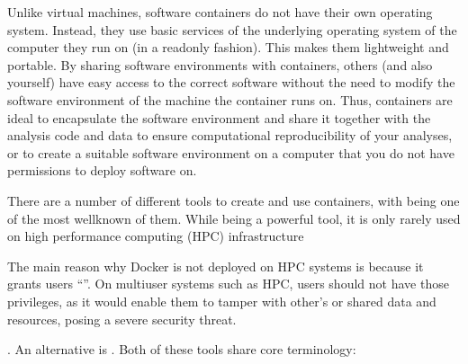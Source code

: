 \sphinxAtStartPar
Unlike virtual machines, software containers do not have their own operating
system. Instead, they use basic services of the underlying operating system
of the computer they run on (in a read\sphinxhyphen{}only fashion). This makes them
lightweight and portable. By sharing software environments with containers,
others (and also yourself) have easy access to the correct software
without the need to modify the software environment of the machine the
container runs on. Thus, containers are ideal to encapsulate the software
environment and share it together with the analysis code and data to ensure
computational reproducibility of your analyses, or to create a suitable
software environment on a computer that you do not have permissions to deploy
software on.

\sphinxAtStartPar
There are a number of different tools to create and use containers, with
 being one of the most well\sphinxhyphen{}known of them.
While being a powerful tool, it is only rarely used on high performance computing
(HPC) infrastructure%
\begin{footnote}\sphinxAtStartFootnote
The main reason why Docker is not deployed on HPC systems is because
it grants users “”.
On multi\sphinxhyphen{}user systems such as HPC, users should not have those
privileges, as it would enable them to tamper with other’s or shared
data and resources, posing a severe security threat.
%
\end{footnote}. An alternative is .
Both of these tools share core terminology:
